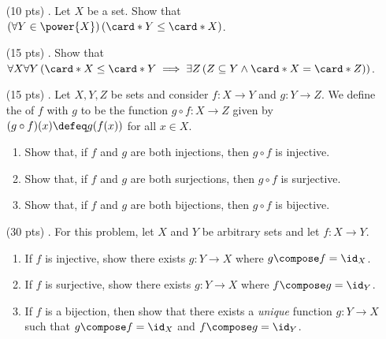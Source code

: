 \begin{enumerate}
  \item[(10 pts) \quad 1.]
    Let $X$ be a set.
    Show that $\left(\forall Y \in \power{X}\right)\left(\card*{Y} \leq \card*{X}\right)$.

  \item[(15 pts) \quad 2.]
    Show that $\forall X \forall Y \left(\card*{X} \leq  \card*{Y} \implies \exists Z \left(Z \subseteq Y \land \card*{X} = \card*{Z}\right)\right)$.

  \item[(15 pts) \quad 3.]
    Let $X, Y, Z$ be sets and consider
    $f: X \to Y$ and $g: Y \to Z$.%
    We define the  of $f$ with $g$ to be the function
    $g \circ f: X \to Z$ given by
    $(g \circ f)(x) \defeq g(f(x))$
    for all $x \in X$.
    \begin{enumerate}
      \item
        Show that, if $f$ and $g$ are both injections, then $g \circ f$ is injective.%
      \item
        Show that, if $f$ and $g$ are both surjections, then $g \circ f$ is surjective.%
      \item
        Show that, if $f$ and $g$ are both bijections, then $g \circ f$ is bijective.
    \end{enumerate}

  \item[(30 pts) \quad 4.]
    For this problem, let $X$ and $Y$ be arbitrary sets and let $f: X \to Y$.
    \begin{enumerate}
      \item
        If $f$ is injective, show there exists $g: Y \to X$ where $g \compose f = \id_X$.
      \item
        If $f$ is surjective, show there exists $g: Y \to X$ where $f \compose g = \id_Y$.
      \item
        If $f$ is a bijection, then show that there exists a \emph{unique} function $g: Y \to X$ such that $g \compose f = \id_X$ and $f \compose g = \id_Y$.
    \end{enumerate}


\end{enumerate}
